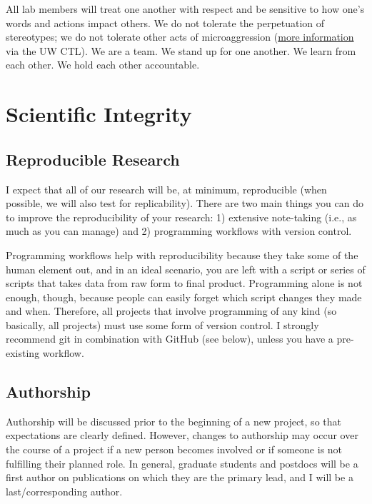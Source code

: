 \documentclass[
]{book}
\begin{document}
All lab members will treat one another with respect and be sensitive to how one's words and actions impact others. We do not tolerate the perpetuation of stereotypes; we do not tolerate other acts of microaggression (\href{https://www.washington.edu/teaching/topics/inclusive-teaching/addressing-microaggressions-in-the-classroom/}{more information} via the UW CTL). We are a team. We stand up for one another. We learn from each other. We hold each other accountable.

\hypertarget{scientific-integrity}{%
\section{Scientific Integrity}\label{scientific-integrity}}

\hypertarget{reproducible-research}{%
\subsection{Reproducible Research}\label{reproducible-research}}

I expect that all of our research will be, at minimum, reproducible (when possible, we will also test for replicability). There are two main things you can do to improve the reproducibility of your research: 1) extensive note-taking (i.e., as much as you can manage) and 2) programming workflows with version control.

Programming workflows help with reproducibility because they take some of the human element out, and in an ideal scenario, you are left with a script or series of scripts that takes data from raw form to final product. Programming alone is not enough, though, because people can easily forget which script changes they made and when. Therefore, all projects that involve programming of any kind (so basically, all projects) must use some form of version control. I strongly recommend git in combination with GitHub (see below), unless you have a pre-existing workflow.

\hypertarget{authorship}{%
\subsection{Authorship}\label{authorship}}

Authorship will be discussed prior to the beginning of a new project, so that expectations are clearly defined. However, changes to authorship may occur over the course of a project if a new person becomes involved or if someone is not fulfilling their planned role. In general, graduate students and postdocs will be a first author on publications on which they are the primary lead, and I will be a last/corresponding author.
\end{document}
